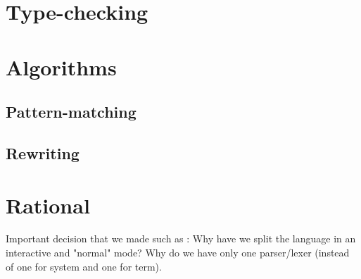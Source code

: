 \documentclass[12pt,a4paper]{article}
\begin{document}
\section{Type-checking}

\section{Algorithms}

\subsection{Pattern-matching}

\subsection{Rewriting}

\section{Rational}
Important decision that we made such as : Why have we split the language in an interactive and "normal" mode? Why do we have only one parser/lexer (instead of one for system and one for term).
\end{document}
